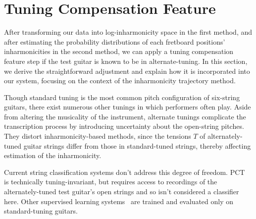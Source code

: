 \documentclass[12pt]{cmuthesis}
\begin{document}
\section{Tuning Compensation Feature}
After transforming our data into log-inharmonicity space in the first method, and after estimating the probability distributions of each fretboard positions' inharmonicities in the second method, we can apply a tuning compensation feature step if the test guitar is known to be in alternate-tuning. In this section, we derive the straightforward adjustment and explain how it is incorporated into our system, focusing on the context of the inharmonicity trajectory method.

Though standard tuning is the most common pitch configuration of six-string guitars, there exist numerous other tunings in which performers often play. Aside from altering the musicality of the instrument, alternate tunings complicate the transcription process by introducing uncertainty about the open-string pitches. They distort inharmonicity-based methods, since the tensions $T$ of alternately-tuned guitar strings differ from those in standard-tuned strings, thereby affecting estimation of the inharmonicity. 

Current string classification systems don't address this degree of freedom. PCT~\cite{barbanchoi2012} is technically tuning-invariant, but requires access to recordings of the alternately-tuned test guitar's open strings and so isn't considered a classifier here. Other supervised learning systems~\cite{kehling2014, dittmar2013, abesser2012} are trained and evaluated only on standard-tuning guitars.
\end{document}
